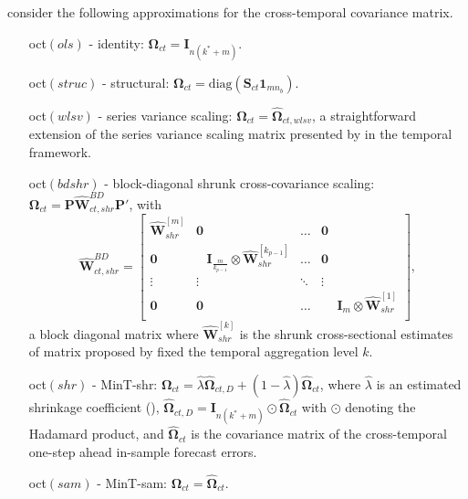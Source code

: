 \documentclass[a4paper,11pt]{article}
\newcommand{\Ivet}{\bm{I}}
\newcommand{\Pvet}{\bm{P}}
\newcommand{\Svet}{\bm{S}}
\newcommand{\Wvet}{\bm{W}}
\newcommand{\Zerovet}{\bm{0}}
\newcommand{\Omegavet}{\bm{\Omega}}
\theoremstyle{definition}
\begin{document}
\cite{difonzo2023} consider the following approximations for the cross-temporal covariance matrix.
\begin{itemize}[nosep, leftmargin=!, labelwidth=, align=right]
	\item[oct$(ols)$ -] identity: $\Omegavet_{ct} = \Ivet_{n(k^*+m)}$.
	\item[oct$(struc)$ -] structural: $\Omegavet_{ct} = \mathrm{diag}(\Svet_{ct} \mathbf{1}_{mn_b})$.
	\item[oct$(wlsv)$ -] series variance scaling: $\Omegavet_{ct} = \widehat{\Omegavet}_{ct,wlsv}$, a straightforward extension of the series variance scaling matrix presented by \cite{athanasopoulos2017} in the temporal framework.
	\item[oct$(bdshr)$ -] block-diagonal shrunk cross-covariance scaling: $\Omegavet_{ct} = \Pvet\widehat{\Wvet}^{BD}_{ct,shr}\Pvet'$, with
		$$
			\widehat{\Wvet}^{BD}_{ct,shr} = \begin{bmatrix}
				\widehat{\Wvet}^{[m]}_{shr} & \Zerovet                                                                         & \dots  & \Zerovet                                                   \\
				\Zerovet                    & \hspace{10pt}\Ivet_{\frac{m}{k_{p-1}}} \otimes \widehat{\Wvet}^{[k_{p-1}]}_{shr} & \dots  & \Zerovet                                                   \\
				\vdots                      & \vdots                                                                           & \ddots & \vdots                                                     \\
				\Zerovet                    & \Zerovet                                                                         & \dots  & \hspace{15pt}\Ivet_{m} \otimes \widehat{\Wvet}^{[1]}_{shr} \\
			\end{bmatrix},
		$$
		a block diagonal matrix where $\widehat{\Wvet}^{[k]}_{shr}$ is the shrunk cross-sectional estimates of matrix proposed by \cite{wickramasuriya2019} fixed the temporal aggregation level $k$.
	\item[oct$(shr)$ -] MinT-shr:   $\Omegavet_{ct} = \hat{\lambda}\widehat{\Omegavet}_{ct,D} + (1-\hat{\lambda})\widehat{\Omegavet}_{ct}$,
	where $\hat{\lambda}$ is an estimated shrinkage coefficient (\citealp{ledoit2004a}), $\widehat{\Omegavet}_{ct,D} = \Ivet_{n(k^\ast + m)} \odot \widehat{\Omegavet}_{ct}$ with $\odot$ denoting the Hadamard product, and $\widehat{\Omegavet}_{ct}$ is the covariance matrix of the cross-temporal one-step ahead in-sample forecast errors.
	\item[oct$(sam)$ -] MinT-sam:  $\Omegavet_{ct} = \widehat{\Omegavet}_{ct}$.
\end{itemize}
\end{document}

